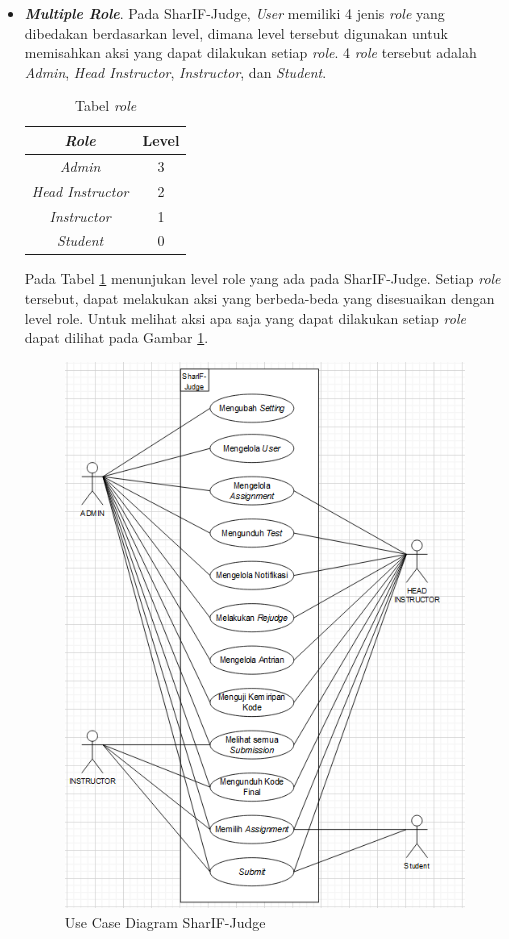 \begin{itemize}
    \item \textbf{{\textit{Multiple Role}}}.
    Pada SharIF-Judge, \textit{User} memiliki 4 jenis \textit{role} yang dibedakan berdasarkan level, dimana level tersebut digunakan untuk memisahkan aksi yang dapat dilakukan setiap \textit{role}. 4 \textit{role} tersebut adalah \textit{Admin}, \textit{Head Instructor}, \textit{Instructor}, dan \textit{Student}. 
        
    \begin{table}[H] %
	    \centering 
	    \caption{Tabel \textit{role}}
	    \label{tab:level}
	    \begin{tabular}{|c|c|}
		    \hline
		    \textit{Role} & Level \\
		    \hline
		    \textit{Admin} & 3 \\
		    \hline
		    \textit{Head Instructor} & 2 \\
		    \hline
		    \textit{Instructor} & 1 \\
		    \hline
		    \textit{Student} & 0 \\
		    \hline
	    \end{tabular} 
    \end{table}
    
        Pada Tabel \ref{tab:level} menunjukan level role yang ada pada SharIF-Judge. Setiap \textit{role} tersebut, dapat melakukan aksi yang berbeda-beda yang disesuaikan dengan level role. Untuk melihat aksi apa saja yang dapat dilakukan setiap \textit{role} dapat dilihat pada Gambar \ref{fig:usecaseD}.
   
   \newpage
  \begin{figure}[h!]
     \centering
     \includegraphics[width=0.8\linewidth]{Gambar/Use_case_Diagram.PNG}
     \caption{Use Case Diagram SharIF-Judge}
     \label{fig:usecaseD}
 \end{figure}
        

\end{itemize}
